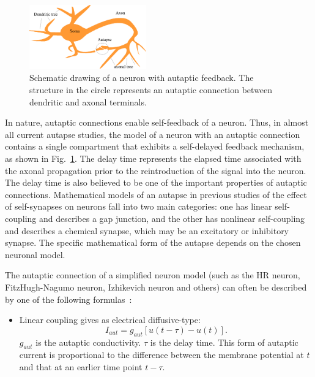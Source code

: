 \documentclass[twocolumn,showpacs,preprintnumbers,amsmath,amssymb,pre,superscriptaddress]{revtex4-1}
\begin{document}
\begin{CJK}{UTF8}{gbsn}
\begin{figure}
\begin{center}
\includegraphics[width=0.45\textwidth]{fig2_autapse.eps}
\end{center}
\caption{Schematic drawing of a neuron with autaptic feedback. The structure in the circle represents an autaptic connection between dendritic and axonal terminals. } 
\label{autapse3}
\end{figure}

In nature, autaptic connections enable self-feedback of a neuron. Thus, in almost all current autapse studies, the model of a neuron with an autaptic connection contains a single compartment that exhibits a self-delayed feedback mechanism, as shown in Fig.~\ref{autapse3}. The delay time represents the elapsed time associated with the axonal propagation prior to the reintroduction of the signal into the neuron. The delay time is also believed to be one of the important properties of autaptic connections. Mathematical models of an autapse in previous studies of the effect of self-synapses on neurons fall into two main categories: one has linear self-coupling and describes a gap junction, and the other has nonlinear self-coupling and describes a chemical synapse, which may be an excitatory or inhibitory synapse. The specific mathematical form of the autapse depends on the chosen neuronal model. 

The autaptic connection of a simplified neuron model (such as the HR neuron, FitzHugh-Nagumo neuron, Izhikevich neuron and others) can often be described by one of the following formulas~\cite{hashemi,wht2014a,majun1}:

\begin{itemize}
\item Linear coupling gives as electrical diffusive-type:
\begin{equation}
I_{aut}=g_{aut}[u(t-\tau)-u(t)]. 
\label{eq1}
\end{equation}
$g_{aut}$ is the autaptic conductivity. $\tau$ is the delay time. This form of autaptic current is proportional to the difference between the membrane potential at $t$ and that at an earlier time point $t-\tau$.


\end{itemize}
\end{CJK}
\end{document}
